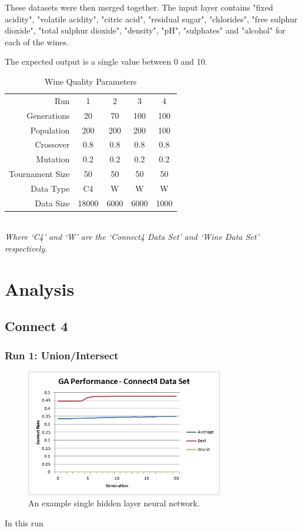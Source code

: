 \documentclass[journal]{IEEEtran}
\begin{document}
  These datasets were then merged together. The input layer contains
  "fixed acidity", "volatile acidity", "citric acid", "residual sugar", "chlorides",
  "free sulphur dioxide", "total sulphur dioxide", "density", "pH", "sulphates" and "alcohol"
  for each of the wines.

  The expected output is a single value between 0 and 10.\cite{wine}

  \begin{table}[here]
    \renewcommand{\arraystretch}{1.3}
    \caption{Wine Quality Parameters}
    \label{E2}
    \centering
    \begin{tabular}{r|cccc}
	Run & 1 & 2 & 3 & 4 \\
	Generations & 20 & 70 & 100 & 100 \\
	Population & 200 & 200 & 200 & 100 \\
	Crossover & 0.8 & 0.8 & 0.8 & 0.8 \\
	Mutation & 0.2 & 0.2 & 0.2 & 0.2 \\
	Tournament Size & 50 & 50 & 50 & 50 \\
	Data Type & C4 & W & W & W \\
	Data Size & 18000 & 6000 & 6000 & 1000 \\
    \end{tabular} \\
	\textit{Where `C4' and `W' are the `Connect4 Data Set' and `Wine Data Set' respectively.}
   \end{table}

\section{Analysis}
	\subsection{Connect 4}
		\subsubsection*{Run 1: Union/Intersect}
			\begin{figure}[here]%
			  \centering
			  \includegraphics[width=3.4in]{connect4_performance_new}
			  \caption{An example single hidden layer neural network.}
			  \label{fig:connect4_performance_new}
			\end{figure}
			In this run 
\end{document}
